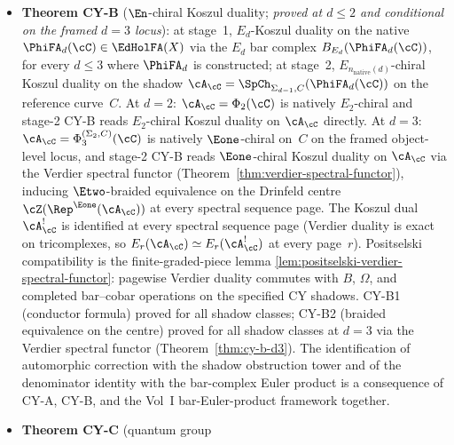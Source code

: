 \begin{itemize}[leftmargin=1.5em,topsep=0.3ex,itemsep=0.5ex]
 the quantum group $R$-matrix is read from the Drinfeld
 centre $\cZ(\Rep^{\Eone}(\cA_\cC))$, where the half-braiding
 $\sigma_{V_u}(V_v)$ on evaluation modules \emph{is} the
 $R$-matrix (Construction~\ref{constr:rmatrix-from-center};
 Remark~\ref{rem:e2-on-drinfeld-centre}). The relative
 Ran form of stage~2 is Theorem~\ref{thm:relative-ran-specialisation}:
 with a fixed curve it commutes with smooth-family base change and
 extends to the log-Fulton--MacPherson nodal boundary. A single CY$_d$
 variety carrying multiple $\Sigma_{d-1}$-fibrations generates
 a family of shadows
 (Remark~\ref{rem:multiple-e1-specialisations}).
 \item \textbf{Theorem CY-B} ($\En$-chiral Koszul duality;
 \emph{proved at $d \leq 2$ and conditional on the framed
 $d = 3$ locus}): at stage~1,
 $E_d$-Koszul duality on the native
 $\PhiFA_d(\cC) \in \EdHolFA(X)$ via the $E_d$ bar complex
 $B_{E_d}(\PhiFA_d(\cC))$, for every $d \leq 3$ where
 $\PhiFA_d$ is constructed; at stage~2,
 $E_{n_{\mathrm{native}}(d)}$-chiral Koszul duality on the
 shadow $\cA_\cC = \SpCh_{\Sigma_{d-1}, C}(\PhiFA_d(\cC))$ on
 the reference curve~$C$. At $d = 2$:
 $\cA_\cC = \Phi_2(\cC)$ is natively $E_2$-chiral and stage-2
 CY-B reads $E_2$-chiral Koszul duality on $\cA_\cC$
	 directly. At $d = 3$: $\cA_\cC =
	 \Phi_3^{(\Sigma_2,C)}(\cC)$ is natively
	 $\Eone$-chiral on~$C$ on the framed object-level locus, and
	 stage-2 CY-B reads
 $\Eone$-chiral Koszul duality on $\cA_\cC$ via the Verdier
 spectral functor (Theorem~\ref{thm:verdier-spectral-functor}),
 inducing $\Etwo$-braided equivalence on the Drinfeld centre
 $\cZ(\Rep^{\Eone}(\cA_\cC))$ at every spectral sequence
 page. The Koszul dual $\cA_\cC^!$ is identified at every
 spectral sequence page (Verdier duality is exact on
 tricomplexes, so
 $E_r(\cA_\cC) \simeq E_r(\cA_\cC^!)$ at every page~$r$).
 Positselski compatibility is the finite-graded-piece lemma
 \ref{lem:positselski-verdier-spectral-functor}: pagewise Verdier
 duality commutes with $B$, $\Omega$, and completed bar--cobar
operations on the specified CY shadows.
 CY-B1 (conductor formula) proved for all shadow classes;
 CY-B2 (braided equivalence on the centre) proved for all
 shadow classes at $d = 3$ via the Verdier spectral functor
 (Theorem~\ref{thm:cy-b-d3}). The identification of
 automorphic correction with the shadow obstruction tower
 and of the denominator identity with the bar-complex Euler
 product is a consequence of CY-A, CY-B, and the Vol~I
 bar-Euler-product framework together.
 \item \textbf{Theorem CY-C} (quantum group

\end{itemize}
